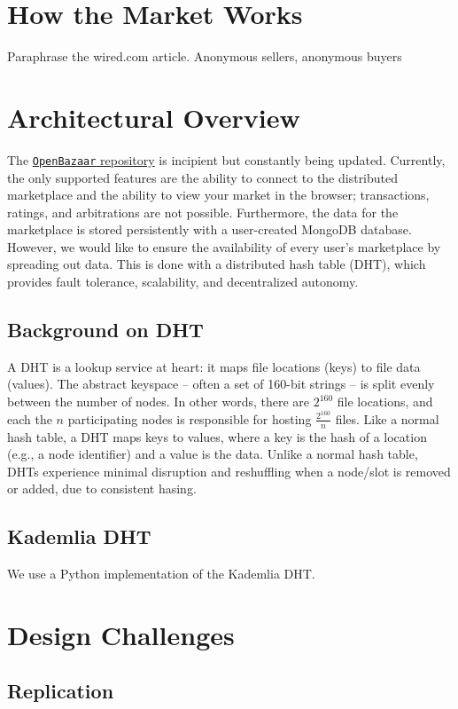 \documentclass[12pt,twocolumn]{article}
\begin{document}
\section{How the Market Works}
Paraphrase the wired.com article. Anonymous sellers, anonymous buyers

\section{Architectural Overview}
The \href{https://github.com/OpenBazaar/OpenBazaar}{{\tt OpenBazaar} repository} is incipient but constantly being updated. Currently, the only supported features are the ability to connect to the distributed marketplace and the ability to view your market in the browser; transactions, ratings, and arbitrations are not possible. Furthermore, the data for the marketplace is stored persistently with a user-created MongoDB database. However, we would like to ensure the availability of every user's marketplace by spreading out data. This is done with a distributed hash table (DHT), which provides fault tolerance, scalability, and decentralized autonomy.

\subsection{Background on DHT}
A DHT is a lookup service at heart: it maps file locations (keys) to file data (values). The abstract keyspace -- often a set of 160-bit strings -- is split evenly between the number of nodes. In other words, there are $2^160$ file locations, and each the $n$ participating nodes is responsible for hosting $\frac{2^160}{n}$ files. 
 Like a normal hash table, a DHT maps keys to values, where a key is the hash of a location (e.g., a node identifier) and a value is the data. Unlike a normal hash table, DHTs experience minimal disruption and reshuffling when a node/slot is removed or added, due to consistent hasing.

\subsection{Kademlia DHT}
We use a Python implementation of the Kademlia DHT.



\section{Design Challenges}
\subsection{Replication}
\end{document}

